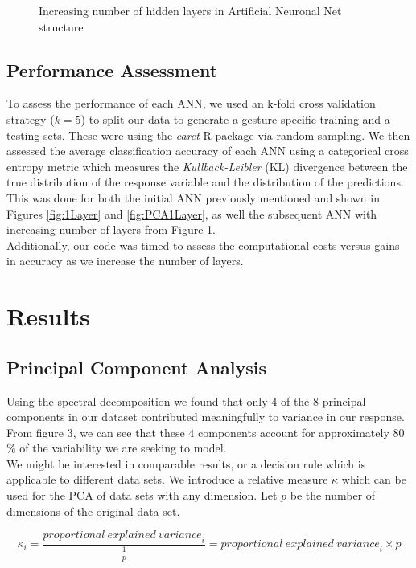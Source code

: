 \documentclass{article}
\begin{document}
\begin{figure}[h]
\begin{subfigure}{.6\textwidth}
\end{subfigure}
\caption{Increasing number of hidden layers in Artificial Neuronal Net structure}
\label{fig:5Layers}
\end{figure}

\subsection{Performance Assessment}
To assess the performance of each ANN, we used an k-fold cross validation strategy ($k =5$) to split our data to generate a gesture-specific training and a testing sets. These were using the \textit{caret} R package via random sampling. We then assessed the average classification accuracy of each ANN using a categorical cross entropy metric which measures the \textit{Kullback-Leibler} (KL) divergence between the true distribution of the response variable and the distribution of the predictions. This was done for both the initial ANN previously mentioned and shown in Figures \ref{fig:1Layer} and \ref{fig:PCA1Layer}, as well the subsequent ANN with increasing number of layers from Figure \ref{fig:5Layers}.\\
Additionally, our code was timed to assess the computational costs versus gains in accuracy as we increase the number of layers.


\section{Results}

\subsection{Principal Component Analysis}

Using the spectral decomposition we found that only $4$ of the $8$ principal components in our dataset contributed meaningfully to variance in our response. From figure $3$, we can see that these $4$ components account for approximately $80$\% of the variability we are seeking to model.\\
We might be interested in comparable results, or a decision rule which is applicable to different data sets. We introduce a relative measure $\kappa$ which can be used for the PCA of data sets with any dimension. Let $p$ be the number of dimensions of the original data set.

\[\kappa_i=\frac{{proportional\ explained\ variance}_i}{\frac{1}{p}}={proportional\ explained\ variance}_i\times p\]
\end{document}

